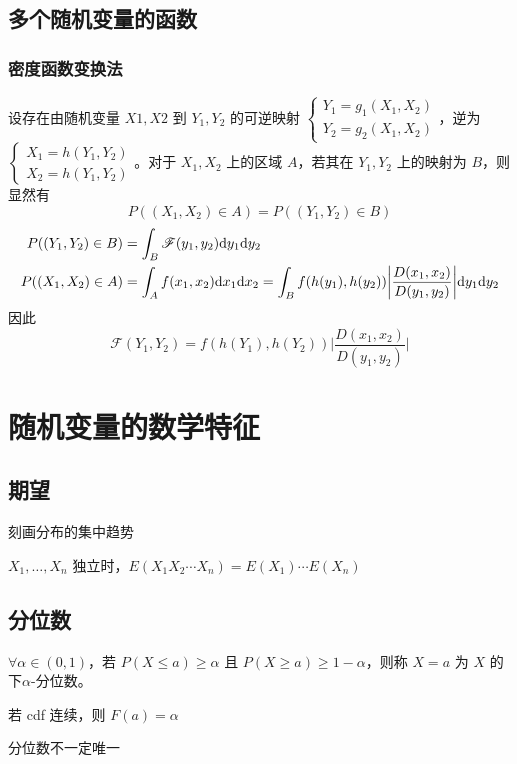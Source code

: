 \documentclass[./main.tex]{subfiles}
\begin{document}
\subsection{多个随机变量的函数}
\subsubsection{密度函数变换法}
设存在由随机变量 $X1,X2$ 到 $Y_1,Y_2$ 的可逆映射 $\begin{cases}Y_1=g_1(X_1,X_2)\\Y_2=g_2(X_1,X_2)\end{cases}$，逆为 $\begin{cases}X_1=h(Y_1,Y_2)\\X_2=h(Y_1,Y_2)\end{cases}$。对于 $X_1,X_2$ 上的区域 $A$，若其在 $Y_1,Y_2$ 上的映射为 $B$，则显然有 $$P((X_1,X_2)\in A)=P((Y_1,Y_2)\in B)$$
\begin{align*}
    P((Y_1,Y_2)\in B)&=\int_B\mathscr{F}(y_1,y_2)\text{d}y_1\text{d}y_2\\
    P((X_1,X_2)\in A)&=\int_Af(x_1,x_2)\text{d}x_1\text{d}x_2=\int_Bf(h(y_1),h(y_2))\bigg|\frac{D{(x_1,x_2)}}{D{(y_1,y_2)}}\bigg|\text{d}y_1\text{d}y_2
\end{align*}
因此
\begin{equation}
    \mathscr{F}(Y_1,Y_2)=f(h(Y_1),h(Y_2))\bigg|\frac{D{(x_1,x_2)}}{D{(y_1,y_2)}}\bigg|
\end{equation}
\section{随机变量的数学特征}
\subsection{期望}
\begin{enumerate*}
    \item 刻画分布的集中趋势
    \item $X_1,\dots,X_n$ 独立时，$E(X_1X_2\cdots X_n)=E(X_1)\cdots E(X_n)$
\end{enumerate*}
\subsection{分位数}
$\forall \alpha\in(0,1)$，若 $P(X\le a)\ge\alpha$ 且 $P(X\ge a)\ge 1-\alpha$，则称 $X=a$ 为 $X$ 的 \textbf{$\text{下}\alpha\text{-分位数}$}。
\begin{enumerate*}
    \item 若 cdf 连续，则 $F(a)=\alpha$
    \item 分位数不一定唯一
\end{enumerate*}
\end{document}
